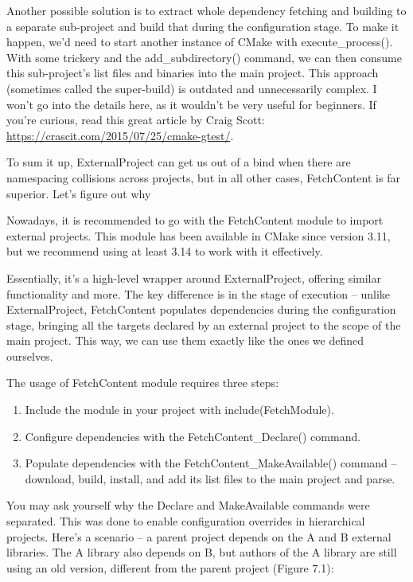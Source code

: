 Another possible solution is to extract whole dependency fetching and building to a separate sub-project and build that during the configuration stage. To make it happen, we'd need to start another instance of CMake with execute\_process(). With some trickery and the add\_subdirectory() command, we can then consume this sub-project's list files and binaries into the main project. This approach (sometimes called the super-build) is outdated and unnecessarily complex. I won't go into the details here, as it wouldn't be very useful for beginners. If you're curious, read this great article by Craig Scott: \url{https://crascit.com/2015/07/25/cmake-gtest/}.

To sum it up, ExternalProject can get us out of a bind when there are namespacing collisions across projects, but in all other cases, FetchContent is far superior. Let's figure out why


Nowadays, it is recommended to go with the FetchContent module to import external projects. This module has been available in CMake since version 3.11, but we recommend using at least 3.14 to work with it effectively.

Essentially, it's a high-level wrapper around ExternalProject, offering similar functionality and more. The key difference is in the stage of execution – unlike ExternalProject, FetchContent populates dependencies during the configuration stage, bringing all the targets declared by an external project to the scope of the main project. This way, we can use them exactly like the ones we defined ourselves.

The usage of FetchContent module requires three steps:

\begin{enumerate}
\item 
Include the module in your project with include(FetchModule).

\item 
Configure dependencies with the FetchContent\_Declare() command.

\item 
Populate dependencies with the FetchContent\_MakeAvailable() command – download, build, install, and add its list files to the main project and parse.
\end{enumerate}

You may ask yourself why the Declare and MakeAvailable commands were separated. This was done to enable configuration overrides in hierarchical projects. Here's a scenario – a parent project depends on the A and B external libraries. The A library also depends on B, but authors of the A library are still using an old version, different from the parent project (Figure 7.1):

